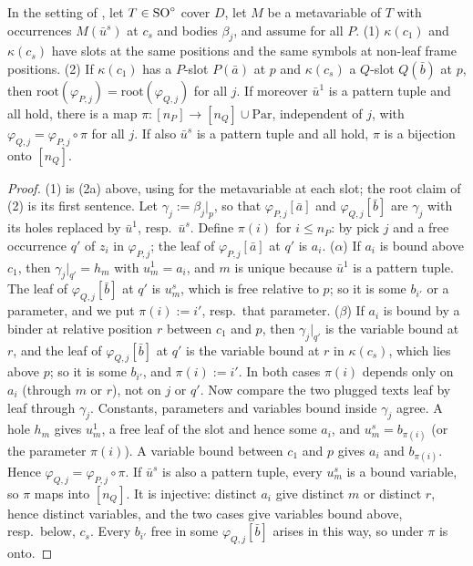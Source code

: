 \begin{lemma}[Facing]\label{lem:zf:facing}
In the setting of , let $T\in\mathrm{SO}^{\circ}$ cover $D$, let $M$ be a metavariable of $T$ with occurrences
$M(\bar u^s)$ at $c_s$ and bodies $\beta_j$, and assume  for all $P$.
(1) $\kappa(c_1)$ and $\kappa(c_s)$ have slots at the same positions and the same symbols at non-leaf frame positions.
(2) If $\kappa(c_1)$ has a $P$-slot $P(\bar a)$ at $p$ and $\kappa(c_s)$ a $Q$-slot $Q(\bar b)$ at $p$, then
$\mathrm{root}(\varphi_{P,j})=\mathrm{root}(\varphi_{Q,j})$ for all $j$. If moreover $\bar u^1$ is a pattern tuple and
all  hold, there is a map $\pi:[n_P]\to[n_Q]\cup\mathrm{Par}$, independent of $j$, with
$\varphi_{Q,j}=\varphi_{P,j}\circ\pi$ for all $j$. If also $\bar u^s$ is a pattern tuple and all  hold, $\pi$ is a
bijection onto $[n_Q]$.
\end{lemma}
\begin{proof}
(1) is (2a) above, using \zfR{} for the metavariable at each slot; the root claim of (2) is its first sentence. Let
$\gamma_j:=\beta_j|_p$, so that $\varphi_{P,j}[\bar a]$ and $\varphi_{Q,j}[\bar b]$ are $\gamma_j$ with its holes
replaced by $\bar u^1$, resp.\ $\bar u^s$. Define $\pi(i)$ for $i\le n_P$: by  pick $j$ and a free occurrence
$q'$ of $z_i$ in $\varphi_{P,j}$; the leaf of $\varphi_{P,j}[\bar a]$ at $q'$ is $a_i$. ($\alpha$) If $a_i$ is bound
above $c_1$, then $\gamma_j|_{q'}=h_m$ with $u^1_m=a_i$, and $m$ is unique because $\bar u^1$ is a pattern tuple. The
leaf of $\varphi_{Q,j}[\bar b]$ at $q'$ is $u^s_m$, which is free relative to $p$; so it is some $b_{i'}$ or a
parameter, and we put $\pi(i):=i'$, resp.\ that parameter. ($\beta$) If $a_i$ is bound by a binder at relative position
$r$ between $c_1$ and $p$, then $\gamma_j|_{q'}$ is the variable bound at $r$, and the leaf of $\varphi_{Q,j}[\bar b]$ at
$q'$ is the variable bound at $r$ in $\kappa(c_s)$, which lies above $p$; so it is some $b_{i'}$, and $\pi(i):=i'$. In
both cases $\pi(i)$ depends only on $a_i$ (through $m$ or $r$), not on $j$ or $q'$. Now compare the two plugged texts leaf
by leaf through $\gamma_j$. Constants, parameters and variables bound inside $\gamma_j$ agree. A hole $h_m$ gives
$u^1_m$, a free leaf of the slot and hence some $a_i$, and $u^s_m=b_{\pi(i)}$ (or the parameter $\pi(i)$). A variable
bound between $c_1$ and $p$ gives $a_i$ and $b_{\pi(i)}$. Hence $\varphi_{Q,j}=\varphi_{P,j}\circ\pi$. If $\bar u^s$ is
also a pattern tuple, every $u^s_m$ is a bound variable, so $\pi$ maps into $[n_Q]$. It is injective: distinct $a_i$ give
distinct $m$ or distinct $r$, hence distinct variables, and the two cases give variables bound above, resp.\ below,
$c_s$. Every $b_{i'}$ free in some $\varphi_{Q,j}[\bar b]$ arises in this way, so under  $\pi$ is onto.
\end{proof}

